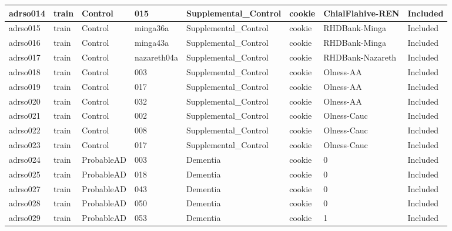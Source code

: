 \begin{center}
\begin{longtable}{|l|l|l|l|l|l|l|l|}
adrso014  & train            & Control      & 015         & Supplemental\_Control & cookie          & ChialFlahive-REN & Included      \\ \hline
adrso015  & train            & Control      & minga36a    & Supplemental\_Control & cookie          & RHDBank-Minga    & Included      \\ \hline
adrso016  & train            & Control      & minga43a    & Supplemental\_Control & cookie          & RHDBank-Minga    & Included      \\ \hline
adrso017  & train            & Control      & nazareth04a & Supplemental\_Control & cookie          & RHDBank-Nazareth & Included      \\ \hline
adrso018  & train            & Control      & 003         & Supplemental\_Control & cookie          & Olness-AA        & Included      \\ \hline
adrso019  & train            & Control      & 017         & Supplemental\_Control & cookie          & Olness-AA        & Included      \\ \hline
adrso020  & train            & Control      & 032         & Supplemental\_Control & cookie          & Olness-AA        & Included      \\ \hline
adrso021  & train            & Control      & 002         & Supplemental\_Control & cookie          & Olness-Cauc      & Included      \\ \hline
adrso022  & train            & Control      & 008         & Supplemental\_Control & cookie          & Olness-Cauc      & Included      \\ \hline
adrso023  & train            & Control      & 017         & Supplemental\_Control & cookie          & Olness-Cauc      & Included      \\ \hline
adrso024  & train            & ProbableAD   & 003         & Dementia             & cookie          & 0                & Included      \\ \hline
adrso025  & train            & ProbableAD   & 018         & Dementia             & cookie          & 0                & Included      \\ \hline
adrso027  & train            & ProbableAD   & 043         & Dementia             & cookie          & 0                & Included      \\ \hline
adrso028  & train            & ProbableAD   & 050         & Dementia             & cookie          & 0                & Included      \\ \hline
adrso029  & train            & ProbableAD   & 053         & Dementia             & cookie          & 1                & Included      \\ \hline

\end{longtable}
\end{center}
